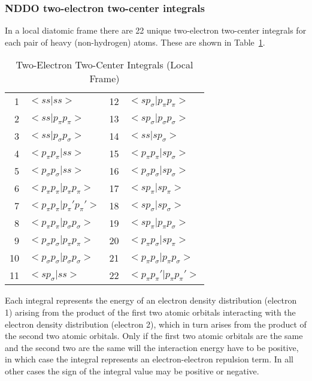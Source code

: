 \documentclass[a4paper]{book}
\begin{document}
\subsubsection{NDDO two-electron two-center integrals}

 In a local diatomic frame there are 22 unique
two-electron two-center integrals for each pair of heavy
(non-hydrogen) atoms. These are shown in Table~\ref{2e2c}.

\begin{table}
\caption{\label{2e2c} Two-Electron Two-Center Integrals (Local Frame)}
\begin{center}
\begin{tabular}{rlcl}
1&$<ss|ss>$&                                   12&$ <sp_{\sigma} |p_{\pi} p_{\pi} >  $\\
2&$<ss|p_{\pi}p_{\pi} >$&                      13&$ <sp_{\sigma} |p_{\sigma} p_{\sigma}>  $\\
3&$<ss|p_{\sigma} p_{\sigma} >$&               14&$ <ss|sp_{\sigma} >  $\\
4&$<p_{\pi} p_{\pi} |ss>$&                     15&$ <p_{\pi} p_{\pi} |sp_{\sigma} >  $\\
5&$<p_{\sigma} p_{\sigma} |ss>$&               16&$ <p_{\sigma} p_{\sigma} |sp_{\sigma} >  $\\
6&$<p_{\pi} p_{\pi} |p_{\pi} p_{\pi} >$&       17&$ <sp_{\pi} |sp_{\pi} >  $\\
7&$<p_{\pi} p_{\pi} |p_{\pi} 'p_{\pi} '>$&     18&$ <sp_{\sigma} |sp_{\sigma} >  $\\
8&$<p_{\pi} p_{\pi} |p_{\sigma} p_{\sigma} >$& 19&$ <sp_{\pi} |p_{\pi} p_{\sigma} >  $\\
9&$<p_{\sigma} p_{\sigma} |p_{\pi} p_{\pi} >$& 20&$ <p_{\pi} p_{\sigma} |sp_{\pi} >  $\\
10&$<p_{\sigma} p_{\sigma} |p_{\sigma} p_{\sigma} >$& 21&$ <p_{\pi} p_{\sigma} |p_{\pi} p_{\sigma} >  $\\
11&$<sp_{\sigma} |ss>$ &                        22&$ <p_{\pi} p_{\pi} '|p_{\pi} p_{\pi} '>  $
\end{tabular}
\end{center}
\end{table}
 Each integral represents the energy of an electron
density distribution (electron 1) arising from the product
of the first two atomic orbitals interacting with the
electron density distribution (electron 2), which in turn arises
from the product of the second two atomic orbitals. Only if
the first two atomic orbitals are the same and the second two
are the same will the interaction energy have to be
positive, in which case the integral represents an
electron-electron repulsion term. In all other cases the
sign of the integral value may be positive or negative.
\end{document}
